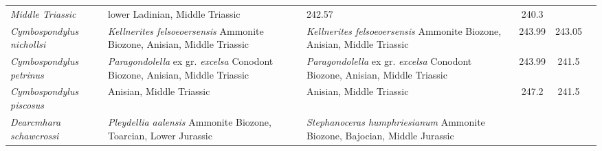 \begin{longtabu}{>{\itshape}lXXSSl}
        Middle Triassic
                                                             & lower Ladinian,
        Middle Triassic
                                                             & 242.57
                                                             & 240.3
                                                             &
                                                             \cite{Sander1989JVP} \\                     
	Cymbospondylus nichollsi                             & \emph{Kellnerites
        felsoeoersensis} Ammonite Biozone, Anisian, Middle Triassic
                                                             & \emph{Kellnerites
        felsoeoersensis} Ammonite Biozone, Anisian, Middle Triassic
                                                             & 243.99
                                                             & 243.05
                                                             &
                                                             \cite{Frobisch2006ZJLS} \\                   
	Cymbospondylus petrinus                              &
        \emph{Paragondolella} ex gr. \emph{excelsa} Conodont Biozone, Anisian,
        Middle Triassic                                             &
        \emph{Paragondolella} ex gr. \emph{excelsa} Conodont Biozone, Anisian,
        Middle Triassic                                             & 243.99
                                                                    & 241.5
                                                                    &
                                                                    \cite{Merriam1908MUC} \\                    
	Cymbospondylus piscosus                              & Anisian, Middle
        Triassic
                                                             & Anisian, Middle
        Triassic
                                                             & 247.2
                                                             & 241.5
                                                             &
                                                             \cite{Merriam1908MUC} \\                    
	Dearcmhara schawcrossi                               & \emph{Pleydellia
        aalensis} Ammonite Biozone, Toarcian, Lower Jurassic
                                                             &
            \emph{Stephanoceras humphriesianum} Ammonite Biozone, Bajocian,
            Middle Jurassic                                                    &

\end{longtabu}
